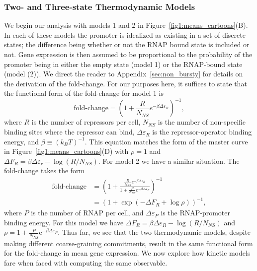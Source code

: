 \subsubsection{Two- and Three-state Thermodynamic Models}
We begin our analysis with models 1 and 2 in
Figure~\ref{fig1:means_cartoons}(B). In each of these models the promoter
is idealized as existing in a set of discrete states; the difference being
whether or not the RNAP bound state is included or not. Gene expression is then
assumed to be proportional to the probability of the promoter being in either
the empty state (model 1) or the RNAP-bound state (model (2)). We direct the
reader to Appendix~\ref{sec:non_bursty} for details on the derivation of the
fold-change. For our purposes here, it suffices to state that the functional
form of the fold-change for model 1 is
\begin{equation}
\text{fold-change}
= \left(1 + \frac{R}{N_{NS}} e^{-\beta\Delta\varepsilon_R}\right)^{-1},
\end{equation}
where $R$ is the number of repressors per cell, $N_{NS}$ is the number of
non-specific binding sites where the repressor can bind, $\Delta\varepsilon_R$
is the repressor-operator binding energy, and $\beta \equiv (k_BT)^{-1}$. This
equation matches the form of the master curve in
Figure~\ref{fig1:means_cartoons}(D) with $\rho=1$ and $\Delta F_R =
\beta\Delta\varepsilon_r - \log (R / N_{NS})$. For model 2 we have a similar
situation. The fold-change takes the form
\begin{align}
\text{fold-change}
&= \left(
1 + \frac{\frac{R}{N_{NS}} e^{-\beta\Delta\varepsilon_R}}
        {1 + \frac{P}{N_{NS}} e^{-\beta\Delta\varepsilon_P}}
\right)^{-1}
\\
&= (1 + \exp(-\Delta F_R + \log\rho))^{-1},
\end{align}
where $P$ is the number of RNAP per cell, and $\Delta\varepsilon_P$ is the
RNAP-promoter binding energy. For this model we have $\Delta F_R =
\beta\Delta\varepsilon_R - \log(R/N_{NS})$ and $\rho = 1 +
\frac{P}{N_{NS}}\mathrm{e}^{-\beta\Delta\varepsilon_P}$. Thus far, we see that
the two thermodynamic models, despite making different coarse-graining
commitments, result in the same functional form for the fold-change in mean gene
expression.  We now explore how kinetic models fare when faced with computing
the same observable.

